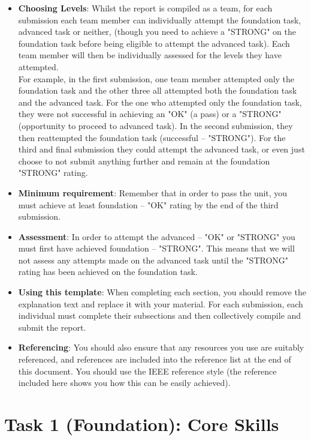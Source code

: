 \documentclass[a4paper, 11pt]{report}
\begin{document}
\begin{itemize}
	\item \textbf{Choosing Levels}: Whilst the report is compiled as a team, for each submission each team member can individually attempt the foundation task, advanced task or neither, (though you need to achieve a "STRONG" on the foundation task before being eligible to attempt the advanced task). Each team member will then be individually assessed for the levels they have attempted.\\ 
	For example, in the first submission, one team member attempted only the foundation task and the other three all attempted both the foundation task and the advanced task. For the one who attempted only the foundation task, they were not successful in achieving an "OK" (a pass) or a "STRONG" (opportunity to proceed to advanced task). In the second submission, they then reattempted the foundation task (successful – "STRONG"). For the third and final submission they could attempt the advanced task, or even just choose to not submit anything further and remain at the foundation "STRONG" rating.
	\item \textbf{Minimum requirement}: Remember that in order to pass the unit, you must achieve at least foundation – "OK" rating by the end of the third submission.
	\item \textbf{Assessment}: In order to attempt the advanced – "OK" or "STRONG" you must first have achieved foundation – "STRONG". This means that we will not assess any attempts made on the advanced task until the "STRONG" rating has been achieved on the foundation task. 
	\item \textbf{Using this template}: When completing each section, you should remove the explanation text and replace it with your material. For each submission, each individual must complete their subsections and then collectively compile and submit the report.
	\item \textbf{Referencing}: You should also ensure that any resources you use are suitably referenced, and references are included into the reference list at the end of this document. You should use the IEEE reference style \cite{usyd2} (the reference included here shows you how this can be easily achieved).
\end{itemize}



\newpage
\section{Task 1 (Foundation): Core Skills}
\end{document}
